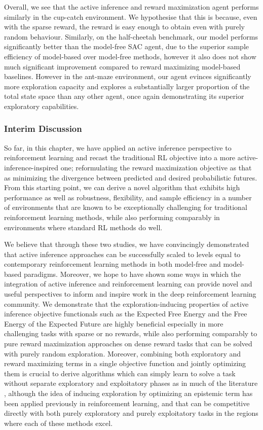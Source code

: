 Overall, we see that the active inference and reward maximization agent performs similarly in the cup-catch environment. We hypothesise that this is because, even with the sparse reward, the reward is easy enough to obtain even with purely random behaviour. Similarly, on the half-cheetah benchmark, our model performs significantly better than the model-free SAC agent, due to the superior sample efficiency of model-based over model-free methods, however it also does not show much significant improvement compared to reward maximizing model-based baselines. However in the ant-maze environment, our agent evinces significantly more exploration capacity and explores a substantially larger proportion of the total state space than any other agent, once again demonstrating its superior exploratory capabilities.

\subsubsection{Interim Discussion}

So far, in this chapter, we have applied an active inference perspective to reinforcement learning and recast the traditional RL objective into a more active-inference-inspired one; reformulating the reward maximization objective as that as minimizing the divergence between predicted and desired probabilistic futures. From this starting point, we can derive a novel algorithm that exhibits high performance as well as robustness, flexibility, and sample efficiency in a number of environments that are known to be exceptionally challenging for traditional reinforcement learning methods, while also performing comparably in environments where standard RL methods do well.

We believe that through these two studies, we have convincingly demonstrated that active inference approaches can be successfully scaled to levels equal to contemporary reinforcement learning methods in both model-free and model-based paradigms. Moreover, we hope to have shown some ways in which the integration of active inference and reinforcement learning can provide novel and useful perspectives to inform and inspire work in the deep reinforcement learning community. We demonstrate that the exploration-inducing properties of active inference objective functionals such as the Expected Free Energy and the Free Energy of the Expected Future are highly beneficial especially in more challenging tasks with sparse or no rewards, while also performing comparably to pure reward maximization approaches on dense reward tasks that can be solved with purely random exploration. Moreover, combining both exploratory and reward maximizing terms in a single objective function and jointly optimizing them is crucial to derive algorithms which can simply learn to solve a task without separate exploratory and exploitatory phases as in much of the literature \citep{shyam_model-based_2019}, although the idea of inducing exploration by optimizing an epistemic term \citep{oudeyer2009intrinsic,schmidhuber2007simple,pathak2017curiosity} has been applied previously in reinforcement learning, and that can be competitive directly with both purely exploratory and purely exploitatory tasks in the regions where each of these methods excel. 

